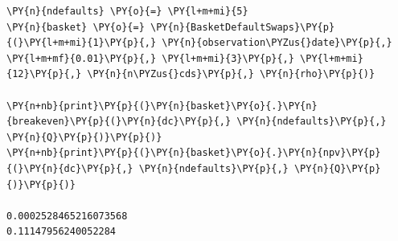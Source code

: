 \begin{Answer}
\begin{tcolorbox}[size=fbox, boxrule=1pt, colback=cellbackground, colframe=cellborder]
\begin{Verbatim}[commandchars=\\\{\}]
\PY{n}{ndefaults} \PY{o}{=} \PY{l+m+mi}{5}
\PY{n}{basket} \PY{o}{=} \PY{n}{BasketDefaultSwaps}\PY{p}{(}\PY{l+m+mi}{1}\PY{p}{,} \PY{n}{observation\PYZus{}date}\PY{p}{,} \PY{l+m+mf}{0.01}\PY{p}{,} \PY{l+m+mi}{3}\PY{p}{,} \PY{l+m+mi}{12}\PY{p}{,} \PY{n}{n\PYZus{}cds}\PY{p}{,} \PY{n}{rho}\PY{p}{)}
	
\PY{n+nb}{print}\PY{p}{(}\PY{n}{basket}\PY{o}{.}\PY{n}{breakeven}\PY{p}{(}\PY{n}{dc}\PY{p}{,} \PY{n}{ndefaults}\PY{p}{,} \PY{n}{Q}\PY{p}{)}\PY{p}{)}
\PY{n+nb}{print}\PY{p}{(}\PY{n}{basket}\PY{o}{.}\PY{n}{npv}\PY{p}{(}\PY{n}{dc}\PY{p}{,} \PY{n}{ndefaults}\PY{p}{,} \PY{n}{Q}\PY{p}{)}\PY{p}{)}

0.0002528465216073568
0.11147956240052284
\end{Verbatim}
\end{tcolorbox}	
\end{Answer}

